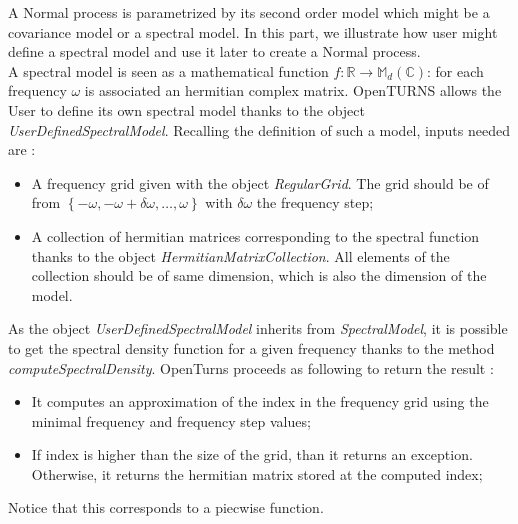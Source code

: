 \renewcommand{\filename}{docUC_StocProc_SpectralModel_Creation.tex}
\renewcommand{\filetitle}{UC : Creation of a spectral model}

\HeaderIIILevel

\label{SpectralModelCreation}

A Normal process is parametrized by its second order model which might be a covariance model or a spectral model. 
In this part, we illustrate how user might define a spectral model and use it later to create a Normal process. \\

A spectral model is seen as a mathematical function $f : \mathbb{R} \rightarrow \mathbb{M}_d(\mathbb{C})$: for each frequency $\omega$ is associated an hermitian complex matrix.
OpenTURNS allows the User to define its own spectral model thanks to the object {\itshape UserDefinedSpectralModel}. 
Recalling the definition of such a model, inputs needed are :
\begin{itemize}
\item A frequency grid given with the object \emph{RegularGrid}. The grid should be of from $\left\{-\omega,-\omega + \delta \omega,\ldots, \omega \right\}$ with $\delta \omega$ the frequency step;
\item A collection of hermitian matrices corresponding to the spectral function thanks to the object \emph{HermitianMatrixCollection}. 
All elements of the collection should be of same dimension, which is also the dimension of the model.
\end{itemize}

As the object \emph{UserDefinedSpectralModel} inherits from \emph{SpectralModel}, it is possible to get the spectral density function for a given frequency thanks to the method {\itshape computeSpectralDensity}.
OpenTurns proceeds as following to return the result :
\begin{itemize}
\item It computes an approximation of the index in the frequency grid using the minimal frequency and frequency step values;
\item If index is higher than the size of the grid, than it returns an exception. Otherwise, it returns the hermitian matrix stored at the computed index;
\end{itemize}
Notice that this corresponds to a piecwise function.\\ \\

